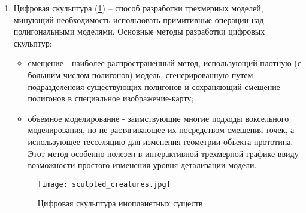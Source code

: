 \begin{enumerate}[label=\arabic*.]
\item{
Цифровая скульптура (\ref{figure:domain:sculpting}) -- способ разработки трехмерных моделей, минующий необходимость использовать примитивные операции над полигональными моделями.
Основные методы разработки цифровых скульптур:
\begin{itemize}
\item смещение - наиболее распространенный метод, использующий плотную (с большим числом полигонов) модель, сгенерированную путем подразделенеия существующих полигонов
и сохраняющий смещение полигонов в специальное изображение-карту;
\item объемное моделирование - заимствующие многие подходы воксельного моделирования, но не растягивающее их посредством смещения точек,
а использующее тесселяцию для изменения геометрии объекта-прототипа. Этот метод особенно полезен в интерактивной трехмерной графике ввиду возможности простого изменения уровня детализации модели.
\end{itemize}
}

\begin{figure}[ht]
\centering
  \texttt{[image: sculpted\_creatures.jpg]}
  \caption{Цифровая скульптура инопланетных существ}
  \label{figure:domain:sculpting}
\end{figure}

\end{enumerate}

